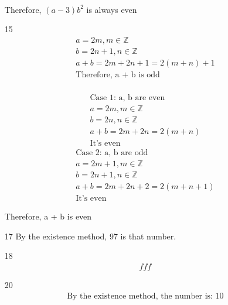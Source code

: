 \documentclass[12pt]{article}
\begin{document}
\begin{enumerate}
\begin{multicols}{2}
\begin{equation*}
\begin{split}
			\end{split}
		\end{equation*}
	    \end{multicols}
	    Therefore, $(a-3)b^2$ is always even
	\item [15] 
	    \begin{equation*}
	    	\begin{split}
		    a = 2m, m \in \mathbb{Z}\\
		    b = 2n + 1, n \in \mathbb{Z}\\
		    a + b = 2m + 2n + 1 = 2(m + n ) + 1\\
		    \text{Therefore, a + b is odd}\\
	    	\end{split}
	    \end{equation*}
	    \begin{multicols}{2}
		\begin{equation*}
			\begin{split}
			    \text{Case 1: a, b are even}\\
			    a = 2m, m \in \mathbb{Z}\\
			    b = 2n, n \in \mathbb{Z}\\
			    a + b = 2m + 2n = 2(m + n)\\
			    \text{It's even}
			\end{split}
		\end{equation*}
		\begin{equation*}
			\begin{split}
			    \text{Case 2: a, b are odd}\\
			    a = 2m + 1, m \in \mathbb{Z}\\
			    b = 2n + 1, n \in \mathbb{Z}\\
			    a + b = 2m + 2n + 2 = 2(m + n + 1)\\
			    \text{It's even}
			\end{split}
		\end{equation*}
	    \end{multicols}
	    Therefore, a + b is even
	\item [17] By the existence method, 97 is that number.
	\item [18] 
	    \begin{equation*}
	    	\begin{split}
	    		fff
	    	\end{split}
	    \end{equation*}
	\item [20] 
	    \begin{equation*}
	    	\begin{split}
		    \text{By the existence method, the number is: 10}
	    	\end{split}
	    \end{equation*}
\end{enumerate}
\end{document}
